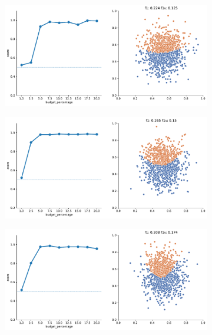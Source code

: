\begin{figure}
    \begin{subfigure}{.5\textwidth}
        \centering
        \includegraphics[width=\textwidth]{img/2d_v2/1.pdf}
    \end{subfigure}%
    \begin{subfigure}{.5\textwidth}
        \centering
        \includegraphics[width=\textwidth]{img/2d_v2/2.pdf}
    \end{subfigure}
    \hfill
    \begin{subfigure}{.5\textwidth}
        \centering
        \includegraphics[width=\textwidth]{img/2d_v2/3.pdf}

\end{subfigure}
\end{figure}
